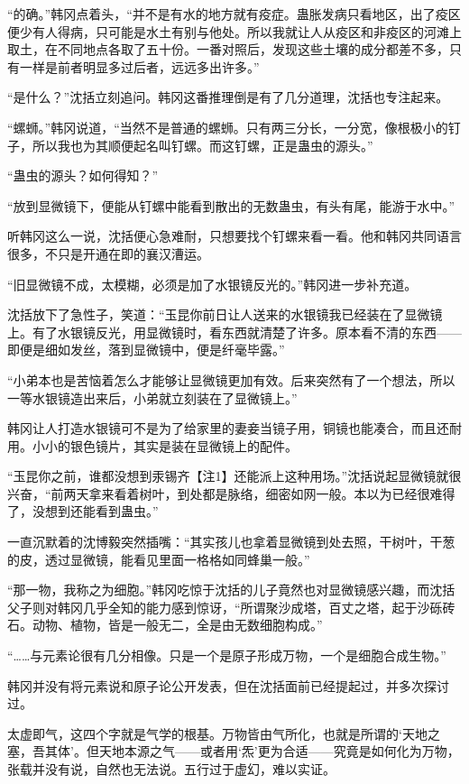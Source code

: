 “的确。”韩冈点着头，“并不是有水的地方就有疫症。蛊胀发病只看地区，出了疫区便少有人得病，只可能是水土有别与他处。所以我就让人从疫区和非疫区的河滩上取土，在不同地点各取了五十份。一番对照后，发现这些土壤的成分都差不多，只有一样是前者明显多过后者，远远多出许多。”

“是什么？”沈括立刻追问。韩冈这番推理倒是有了几分道理，沈括也专注起来。

“螺蛳。”韩冈说道，“当然不是普通的螺蛳。只有两三分长，一分宽，像根极小的钉子，所以我也为其顺便起名叫钉螺。而这钉螺，正是蛊虫的源头。”

“蛊虫的源头？如何得知？”

“放到显微镜下，便能从钉螺中能看到散出的无数蛊虫，有头有尾，能游于水中。”

听韩冈这么一说，沈括便心急难耐，只想要找个钉螺来看一看。他和韩冈共同语言很多，不只是开通在即的襄汉漕运。

“旧显微镜不成，太模糊，必须是加了水银镜反光的。”韩冈进一步补充道。

沈括放下了急性子，笑道：“玉昆你前日让人送来的水银镜我已经装在了显微镜上。有了水银镜反光，用显微镜时，看东西就清楚了许多。原本看不清的东西——即便是细如发丝，落到显微镜中，便是纤毫毕露。”

“小弟本也是苦恼着怎么才能够让显微镜更加有效。后来突然有了一个想法，所以一等水银镜造出来后，小弟就立刻装在了显微镜上。”

韩冈让人打造水银镜可不是为了给家里的妻妾当镜子用，铜镜也能凑合，而且还耐用。小小的银色镜片，其实是装在显微镜上的配件。

“玉昆你之前，谁都没想到汞锡齐【注1】还能派上这种用场。”沈括说起显微镜就很兴奋，“前两天拿来看着树叶，到处都是脉络，细密如网一般。本以为已经很难得了，没想到还能看到蛊虫。”

一直沉默着的沈博毅突然插嘴：“其实孩儿也拿着显微镜到处去照，干树叶，干葱的皮，透过显微镜，能看见里面一格格如同蜂巢一般。”

“那一物，我称之为细胞。”韩冈吃惊于沈括的儿子竟然也对显微镜感兴趣，而沈括父子则对韩冈几乎全知的能力感到惊讶，“所谓聚沙成塔，百丈之塔，起于沙砾砖石。动物、植物，皆是一般无二，全是由无数细胞构成。”

“……与元素论很有几分相像。只是一个是原子形成万物，一个是细胞合成生物。”

韩冈并没有将元素说和原子论公开发表，但在沈括面前已经提起过，并多次探讨过。

太虚即气，这四个字就是气学的根基。万物皆由气所化，也就是所谓的‘天地之塞，吾其体’。但天地本源之气——或者用‘炁’更为合适——究竟是如何化为万物，张载并没有说，自然也无法说。五行过于虚幻，难以实证。

